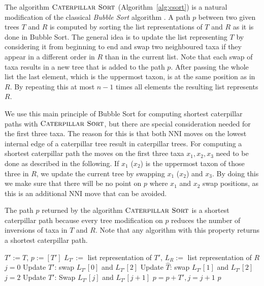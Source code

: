 \documentclass{amsart}
\newcommand{\nni}{\mathrm{NNI}}
\newcommand{\csort}{\textsc{Caterpillar Sort}}
\begin{document}
The algorithm $\csort$ (Algorithm~\ref{alg:csort}) is a natural modification of the classical \emph{Bubble Sort} algorithm \autocite{Knuth1997-pi}.
A path $p$ between two given trees $T$ and $R$ is computed by sorting the list representations of $T$ and $R$ as it is done in Bubble Sort.
The general idea is to update the list representing $T$ by considering it from beginning to end and swap two neighboured taxa if they appear in a different order in $R$ than in the current list.
Note that each swap of taxa results in a new tree that is added to the path $p$.
After passing the whole list the last element, which is the uppermost taxon, is at the same position as in $R$.
By repeating this at most $n-1$ times all elements the resulting list represents $R$.

We use this main principle of Bubble Sort for computing shortest caterpillar paths with $\csort$, but there are special consideration needed for the first three taxa.
The reason for this is that both $\nni$ moves on the lowest internal edge of a caterpillar tree result in caterpillar trees.
For computing a shortest caterpillar path the moves on the first three taxa $x_1, x_2, x_3$ need to be done as described in the following.
If $x_1$ ($x_2$) is the uppermost taxon of those three in $R$, we update the current tree by swapping $x_1$ ($x_2$) and $x_3$.
By doing this we make sure that there will be no point on $p$ where $x_1$ and $x_2$ swap positions, as this is an additional $\nni$ move that can be avoided.

The path $p$ returned by the algorithm $\csort$ is a shortest caterpillar path because every tree modification on $p$ reduces the number of inversions of taxa in $T$ and $R$.
Note that any algorithm with this property returns a shortest caterpillar path.

\begin{algorithm}[H]
\caption{$\csort$($T,R$)}
\label{alg:csort}
\begin{algorithmic}[1]
\STATE $T':= T$, $p := [T']$
\STATE $L_{T'}:=$ list representation of $T'$, $L_R:=$ list representation of $R$
 \label{alg:csort:line:loop}
\STATE $j = 0$ 
\STATE Update $T'$: swap $L_{T'}[0]$ and $L_{T'}[2]$
\STATE Update $\hat T$: swap $L_{T'}[1]$ and $L_{T'}[2]$
\ENDIF
\STATE $j = 2$
\STATE Update $T'$: Swap $L_{T'}[j]$ and $L_{T'}[j+1]$
\STATE $p = p+T', j = j + 1$
\ENDWHILE
\ENDFOR
\RETURN $p$
\end{algorithmic}
\end{algorithm}
\end{document}
